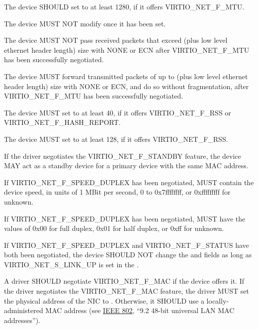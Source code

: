 The device SHOULD set  to at least 1280, if it offers
VIRTIO_NET_F_MTU.

The device MUST NOT modify  once it has been set.

The device MUST NOT pass received packets that exceed  (plus low
level ethernet header length) size with  NONE or ECN
after VIRTIO_NET_F_MTU has been successfully negotiated.

The device MUST forward transmitted packets of up to  (plus low
level ethernet header length) size with  NONE or ECN, and do
so without fragmentation, after VIRTIO_NET_F_MTU has been successfully
negotiated.

The device MUST set  to at least 40, if it offers
VIRTIO_NET_F_RSS or VIRTIO_NET_F_HASH_REPORT.

The device MUST set  to at least 128, if it offers
VIRTIO_NET_F_RSS.

If the driver negotiates the VIRTIO_NET_F_STANDBY feature, the device MAY act
as a standby device for a primary device with the same MAC address.

If VIRTIO_NET_F_SPEED_DUPLEX has been negotiated, 
MUST contain the device speed, in units of 1 MBit per second, 0 to
0x7ffffffff, or 0xfffffffff for unknown.

If VIRTIO_NET_F_SPEED_DUPLEX has been negotiated, 
MUST have the values of 0x00 for full duplex, 0x01 for half
duplex, or 0xff for unknown.

If VIRTIO_NET_F_SPEED_DUPLEX and VIRTIO_NET_F_STATUS have both
been negotiated, the device SHOULD NOT change the  and
 fields as long as VIRTIO_NET_S_LINK_UP is set in
the .


A driver SHOULD negotiate VIRTIO_NET_F_MAC if the device offers it.
If the driver negotiates the VIRTIO_NET_F_MAC feature, the driver MUST set
the physical address of the NIC to .  Otherwise, it SHOULD
use a locally-administered MAC address (see \hyperref[intro:IEEE 802]{IEEE 802},
``9.2 48-bit universal LAN MAC addresses'').

